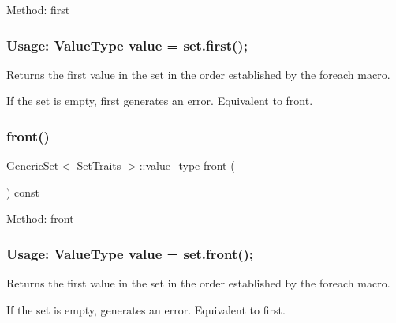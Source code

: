 Method\+: first \subsubsection*{Usage\+: Value\+Type value = set.\+first(); }

Returns the first value in the set in the order established by the {\ttfamily foreach} macro. 

If the set is empty, {\ttfamily first} generates an error. Equivalent to front. \mbox{\label{classstanfordcpplib_1_1collections_1_1GenericSet_a9c9f0cc6419ef7e036df4eeac4825b2c}} 
\subsubsection{\texorpdfstring{front()}{front()}}
{\footnotesize\ttfamily \mbox{\hyperlink{classstanfordcpplib_1_1collections_1_1GenericSet}{Generic\+Set}}$<$ \mbox{\hyperlink{structstanfordcpplib_1_1collections_1_1SetTraits}{Set\+Traits}} $>$\+::\mbox{\hyperlink{classstanfordcpplib_1_1collections_1_1GenericSet_a669c81f158766925e7293f97c0099b28}{value\+\_\+type}} front (\begin{DoxyParamCaption}{ }\end{DoxyParamCaption}) const}



Method\+: front \subsubsection*{Usage\+: Value\+Type value = set.\+front(); }

Returns the first value in the set in the order established by the {\ttfamily foreach} macro. 

If the set is empty, generates an error. Equivalent to first. \mbox{\label{classstanfordcpplib_1_1collections_1_1GenericSet_aa81ff41776176f38b1a5c616f1815831}} 
